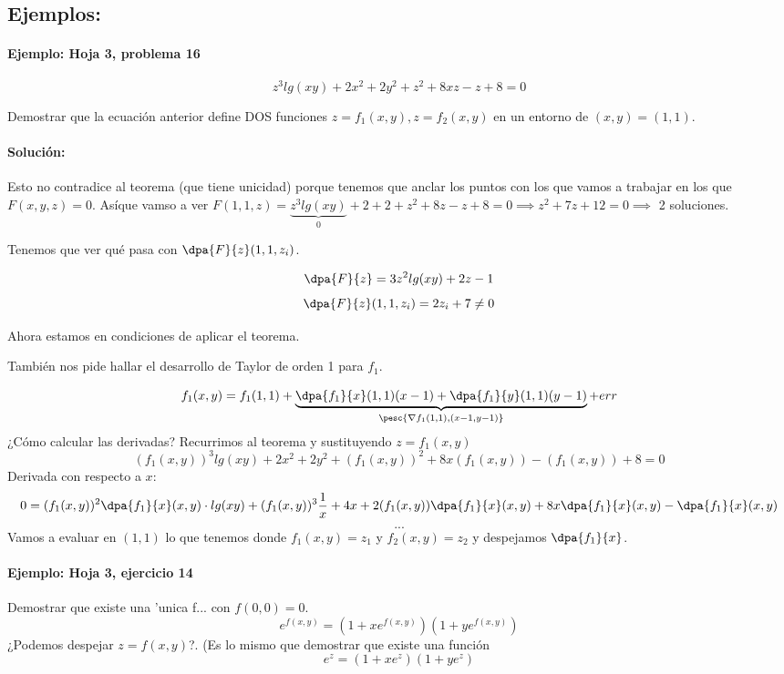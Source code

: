 \documentclass{apuntes}
\begin{document}
\subsection{Ejemplos:}
\paragraph{Ejemplo: Hoja 3, problema 16}

$$z^3lg(xy) + 2x^2 + 2y^2 +z^2 + 8xz - z + 8 =0$$

Demostrar que la ecuación anterior define DOS funciones $z = f_1(x,y), z = f_2(x,y)$ en un entorno de $(x,y)=(1,1)$.

\paragraph{Solución: }

Esto no contradice al teorema (que tiene unicidad) porque tenemos que anclar los puntos con los que vamos a trabajar en los que $F(x,y,z) = 0$. Asíque vamso a ver $F(1,1,z) = \underbrace{z^3lg(xy)}_{0} + 2 + 2 + z^2 + 8z -z +8 = 0 \implies z^2+7z+12 = 0 \implies $ 2 soluciones.

Tenemos que ver qué pasa con $\displaystyle \dpa{F}{z}(1,1,z_i)$.

\[\dpa{F}{z} = 3z^2lg(xy) + 2z -1\]
\[\dpa{F}{z}(1,1,z_i) = 2z_i + 7 \neq 0\]

Ahora estamos en condiciones de aplicar el teorema.

También nos pide hallar el desarrollo de Taylor de orden 1 para $f_1$.

\[f_1(x,y) = f_1(1,1) + \underbrace{\dpa{f_1}{x}(1,1)(x-1) + \dpa{f_1}{y}(1,1) (y-1)}_{\pesc{\nabla f_1(1,1),(x-1,y-1)}} + err\]
¿Cómo calcular las derivadas? Recurrimos al teorema y sustituyendo $z=f_1(x,y)$
\[(f_1(x,y))^3 lg(xy) + 2x^2 + 2y^2 + (f_1(x,y))^2 + 8x(f_1(x,y))-(f_1(x,y))+8 = 0\]
Derivada con respecto a $x$:
\[ 0 = (f_1(x,y))^2\dpa{f_1}{x}(x,y)\cdot lg(xy) + (f_1(x,y))^3 \frac{1}{x}+4x + 2(f_1(x,y))\dpa{f_1}{x}(x,y) + 8x\dpa{f_1}{x}(x,y) - \dpa{f_1}{x}(x,y)\]
\[...\]
Vamos a evaluar en $(1,1)$ lo que tenemos donde $f_1(x,y) = z_1$ y $f_2(x,y) = z_2$ y despejamos $\dpa{f_1}{x}$.

\paragraph{Ejemplo: Hoja 3, ejercicio 14}

Demostrar que existe una 'unica f... con $f(0,0) = 0$.
$$e^{f(x,y)} = (1+xe^{f(x,y)})(1+ye^{f(x,y)})$$
¿Podemos despejar $z = f(x,y)$?. (Es lo mismo que demostrar que existe una función $$e^{z} = (1+xe^z)(1+ye^z)$$
\end{document}
